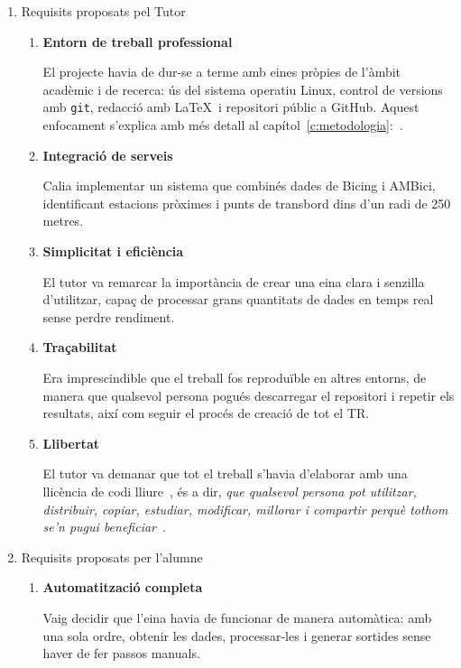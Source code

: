 \begin{enumerate}
 \item Requisits proposats pel Tutor
    \begin{enumerate}
        \item \textbf{Entorn de treball professional}

        El projecte havia de dur-se a terme amb eines pròpies de l’àmbit acadèmic i de recerca:
        ús del sistema operatiu Linux, control de versions amb \texttt{git},
        redacció amb \LaTeX~i repositori públic a GitHub.
        Aquest enfocament s’explica amb més detall al capítol~\ref{c:metodologia}:~.

        \item \textbf{Integració de serveis}

        Calia implementar un sistema que combinés dades de Bicing i AMBici,
        identificant estacions pròximes i punts de transbord dins d’un radi de 250 metres.

        \item \textbf{Simplicitat i eficiència}

        El tutor va remarcar la importància de crear una eina clara i senzilla d’utilitzar,
        capaç de processar grans quantitats de dades en temps real sense perdre rendiment.

        \item \textbf{Traçabilitat}

        Era imprescindible que el treball fos reproduïble en altres entorns, de manera que qualsevol persona
        pogués descarregar el repositori i repetir els resultats, així com seguir el procés de creació de tot el TR.

        \item \textbf{Llibertat}

        El tutor va demanar que tot el treball s'havia d'elaborar amb una llicència de codi lliure~\cite{GNU-ca}, és a dir, \textit{que qualsevol persona pot utilitzar, distribuir, copiar, estudiar, modificar, millorar i compartir perquè tothom se'n pugui beneficiar}~\cite{programariLliure}.
    \end{enumerate}

 \item Requisits proposats per l’alumne
    \begin{enumerate}
        \item \textbf{Automatització completa}

        Vaig decidir que l’eina havia de funcionar de manera automàtica: amb una sola ordre, obtenir les dades,
        processar-les i generar sortides sense haver de fer passos manuals.


\end{enumerate}
\end{enumerate}
